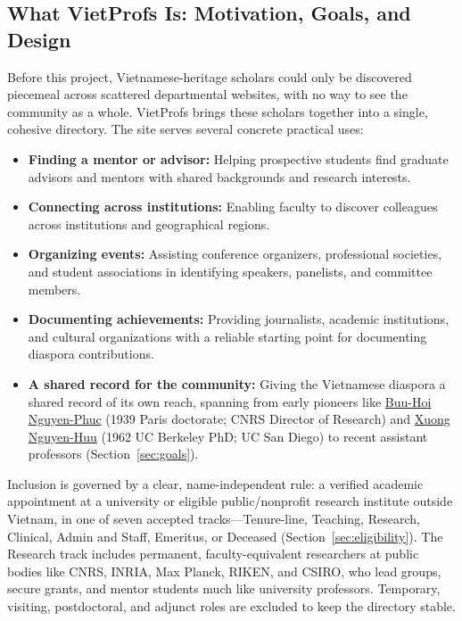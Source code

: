 \documentclass[11pt]{article}
\newcommand{\vplink}[2]{\href{https://vietprofs.roars.dev/?q=#1}{#2}}
\begin{document}
\subsection{What VietProfs Is: Motivation, Goals, and Design}
\label{sec:intro-what}
Before this project, Vietnamese-heritage scholars could only be discovered piecemeal across scattered departmental websites, with no way to see the community as a whole.
VietProfs brings these scholars together into a single, cohesive directory.
The site serves several concrete practical uses:
\begin{itemize}
\item \textbf{Finding a mentor or advisor:} Helping prospective students find graduate advisors and mentors with shared backgrounds and research interests.
\item \textbf{Connecting across institutions:} Enabling faculty to discover colleagues across institutions and geographical regions.
\item \textbf{Organizing events:} Assisting conference organizers, professional societies, and student associations in identifying speakers, panelists, and committee members.
\item \textbf{Documenting achievements:} Providing journalists, academic institutions, and cultural organizations with a reliable starting point for documenting diaspora contributions.
\item \textbf{A shared record for the community:} Giving the Vietnamese diaspora a shared record of its own reach, spanning from early pioneers like \vplink{Buu-Hoi+Nguyen-Phuc}{Buu-Hoi Nguyen-Phuc} (1939 Paris doctorate; CNRS Director of Research) and \vplink{Xuong+Nguyen-Huu}{Xuong Nguyen-Huu} (1962 UC Berkeley PhD; UC San Diego) to recent assistant professors (Section~\ref{sec:goals}).
\end{itemize}

Inclusion is governed by a clear, name-independent rule: a verified academic appointment at a university or eligible public/nonprofit research institute outside Vietnam, in one of seven accepted tracks---Tenure-line, Teaching, Research, Clinical, Admin and Staff, Emeritus, or Deceased (Section~\ref{sec:eligibility}).
The Research track includes permanent, faculty-equivalent researchers at public bodies like CNRS, INRIA, Max Planck, RIKEN, and CSIRO, who lead groups, secure grants, and mentor students much like university professors.
Temporary, visiting, postdoctoral, and adjunct roles are excluded to keep the directory stable.
\end{document}
